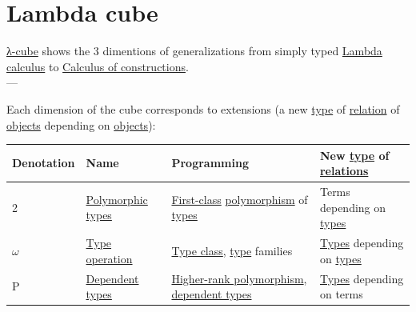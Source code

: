 \documentclass[a4paper,14pt,oneside]{book}
\begin{document}
\section{\label{orgde97469}Lambda cube}
\label{sec:org632208e}
\hyperref[org4e4708c]{λ-cube} shows the 3 dimentions of generalizations from simply typed \hyperref[orgcf901a1]{Lambda calculus} to \hyperref[orgc62bfbb]{Calculus of constructions}.\\

---\\



Each dimension of the cube corresponds to extensions (a new \hyperref[orgabebcbb]{type} of \hyperref[org765a6f3]{relation} of \hyperref[orgb8fbe0c]{objects} depending on \hyperref[orgb8fbe0c]{objects}):\\

\begin{table}[htbp]
\label{tab--lambda-calculus-generalizations}
\centering
\begin{tabular}{llll}
Denotation & Name & Programming & New \hyperref[orgabebcbb]{type} of \hyperref[org7f4c2a2]{relations}\\
\hline
2 & \hyperref[org66d4832]{Polymorphic} \hyperref[orgd9fe071]{types} & \hyperref[org0362162]{First-class} \hyperref[org8bb6e41]{polymorphism} of \hyperref[orgd9fe071]{types} & Terms depending on \hyperref[orgd9fe071]{types}\\
\(\omega\) & \hyperref[orgabebcbb]{Type} \hyperref[orgee54940]{operation} & \hyperref[org348d328]{Type class}, \hyperref[orgabebcbb]{type} families & \hyperref[orgd9fe071]{Types} depending on \hyperref[orgd9fe071]{types}\\
P & \hyperref[org292ae59]{Dependent types} & \hyperref[orgee85c49]{Higher-rank polymorphism}, \hyperref[org292ae59]{dependent types} & \hyperref[orgd9fe071]{Types} depending on terms\\
\end{tabular}
\end{table}
\end{document}
